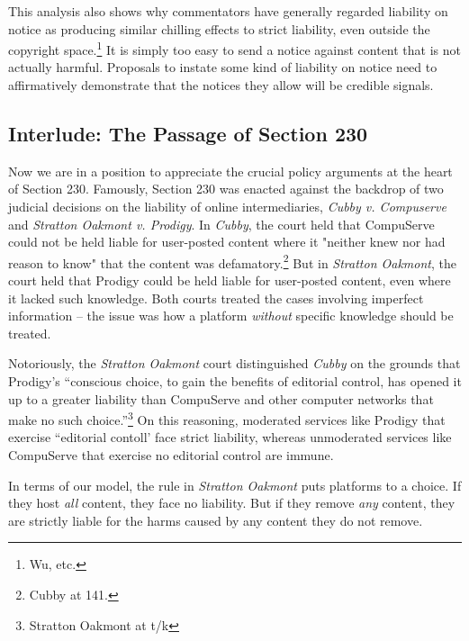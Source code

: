 This analysis also shows why commentators have generally regarded liability on notice as producing similar chilling effects to strict liability, even outside the copyright space.\footnote{Wu, etc.} It is simply too easy to send a notice against content that is not actually harmful. Proposals to instate some kind of liability on notice need to affirmatively demonstrate that the notices they allow will be credible signals.


\subsection{Interlude: The Passage of Section 230}
\label{sec:passage}

Now we are in a position to appreciate the crucial policy arguments at the heart of Section 230. Famously, Section 230 was enacted against the backdrop of two judicial decisions on the liability of online intermediaries, \emph{Cubby v. Compuserve} and \emph{Stratton Oakmont v. Prodigy}. In \emph{Cubby}, the court held that CompuServe could not be held liable for user-posted content where it "neither knew nor had reason to know" that the content was defamatory.\footnote{Cubby at 141.} But in \emph{Stratton Oakmont}, the court held that Prodigy could be held liable for user-posted content, even where it lacked such knowledge. Both courts treated the cases involving imperfect information -- the issue was how a platform \emph{without} specific knowledge should be treated.

Notoriously, the \emph{Stratton Oakmont} court distinguished \emph{Cubby} on the grounds that Prodigy's ``conscious choice, to gain the benefits of editorial control, has opened it up to a greater liability than CompuServe and other computer networks that make no such choice.''\footnote{Stratton Oakmont at t/k} On this reasoning, moderated services like Prodigy that exercise ``editorial contoll' face strict liability, whereas unmoderated services like CompuServe that exercise no editorial control are immune.

In terms of our model, the rule in \emph{Stratton Oakmont} puts platforms to a choice. If they host \emph{all} content, they face no liability. But if they remove \emph{any} content, they are strictly liable for the harms caused by any content they do not remove.  

